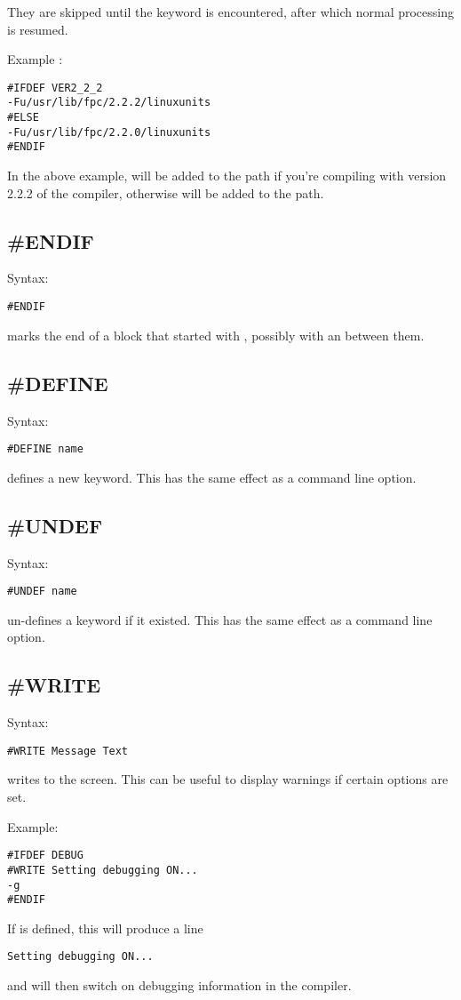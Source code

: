 They are skipped until the keyword  is
encountered, after which normal processing is resumed.

Example :
\begin{verbatim}
#IFDEF VER2_2_2
-Fu/usr/lib/fpc/2.2.2/linuxunits
#ELSE
-Fu/usr/lib/fpc/2.2.0/linuxunits
#ENDIF
\end{verbatim}
In the above example,  will be added to
the path if you're compiling with version 2.2.2 of the compiler,
otherwise  will be added to the path.

\subsection{\#ENDIF}
Syntax:
\begin{verbatim}
#ENDIF
\end{verbatim}
 marks the end of a block that started with ,
possibly with an  between them.

\subsection{\#DEFINE}
Syntax:
\begin{verbatim}
#DEFINE name
\end{verbatim}
 defines a new keyword. This has the same effect as a
  command line option.

\subsection{\#UNDEF}
Syntax:
\begin{verbatim}
#UNDEF name
\end{verbatim}
 un-defines a keyword if it existed.
This has the same effect as a   command line option.

\subsection{\#WRITE}
Syntax:
\begin{verbatim}
#WRITE Message Text
\end{verbatim}
 writes  to the screen.
This can be useful to display warnings if certain options are set.

Example:
\begin{verbatim}
#IFDEF DEBUG
#WRITE Setting debugging ON...
-g
#ENDIF
\end{verbatim}
If  is defined, this will produce a line
\begin{verbatim}
Setting debugging ON...
\end{verbatim}
and will then switch on debugging information in the compiler.

